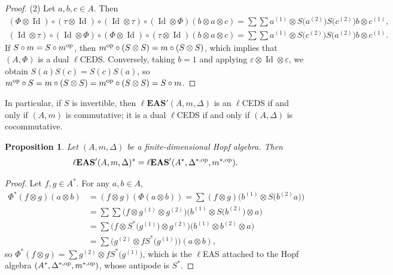 \documentclass[10pt,a4paper]{amsart}
\numberwithin{equation}{section}
\newtheorem{Proposition}[Theorem]{Proposition}
 { \theoremstyle{definition}
\newtheorem{Definition}[Theorem]{Definition}
\newtheorem{Note}[Theorem]{Note}
\newtheorem{Example}[Theorem]{Example}
\newtheorem{Remark}[Theorem]{Remark}
\newtheorem{Notation}[Theorem]{Notation}}
\newcommand{\leas}{\ell\mathbf{EAS}}
\begin{document}
\begin{proof}
(2) Let $a,b,c\in A$. Then
\begin{gather*}
(\Phi\otimes \operatorname{Id})\circ (\tau \otimes \operatorname{Id})\circ (\operatorname{Id} \otimes \tau)\circ (\operatorname{Id} \otimes \Phi)(b\otimes a\otimes c)=\sum \sum a^{(1)}\otimes S\bigl(a^{(2)}\bigr)S\bigl(c^{(2)}\bigr)b\otimes c^{(1)},\\
\nonumber(\operatorname{Id} \otimes \tau)\circ (\operatorname{Id} \otimes \Phi)\circ (\Phi\otimes \operatorname{Id})\circ (\tau \otimes \operatorname{Id})(b\otimes a\otimes c)=\sum \sum a^{(1)}\otimes S\bigl(c^{(2)}\bigr)S\bigl(a^{(2)}\bigr)b\otimes c^{(1)}.
\end{gather*}
If $S\circ m=S\circ m^{\rm op}$, then $m^{\rm op}\circ (S\otimes S)=m\circ (S\otimes S)$, which implies that $(A,\Phi)$ is a dual $\ell$CEDS. Conversely, taking $b=1$ and applying $\varepsilon \otimes \operatorname{Id} \otimes \varepsilon$, we obtain
$S(a)S(c)=S(c)S(a)$,
so~${m^{\rm op}\circ S=m\circ (S\otimes S)=m^{\rm op}\circ (S\otimes S)=S\circ m}$. \end{proof}

\begin{Remark}
In particular, if $S$ is invertible, then $\leas'(A,m,\Delta)$ is an $\ell$CEDS if and only if $(A,m)$ is commutative; it is a dual $\ell$CEDS if and only if $(A,\Delta)$ is cocommutative.
\end{Remark}

\begin{Proposition}
Let $(A,m,\Delta)$ be a finite-dimensional Hopf algebra. Then \[
\leas'(A,m,\Delta)^* =\leas'(A^*,\Delta^{*,{\rm op}},m^{*,{\rm op}}).\]
\end{Proposition}

\begin{proof}
Let $f,g\in A^*$. For any $a,b\in A$,
\begin{align*}
\Phi^*(f\otimes g)(a\otimes b)&=(f\otimes g)(\Phi(a\otimes b))=\sum (f\otimes g)\bigl(b^{(1)}\otimes S\bigl(b^{(2)}a\bigr)\bigr)\\
&=\sum \sum \bigl(f\otimes g^{(1)}\otimes g^{(2)}\bigr)\bigl(b^{(1)}\otimes S\bigl(b^{(2)}\bigr)\otimes a\bigr)\\
&=\sum \bigl(f\otimes S^*\bigl(g^{(1)}\bigr)\otimes g^{(2)}\bigr)\bigl(b^{(1)}\otimes b^{(2)}\otimes a\bigr)\\
&=\sum \bigl(g^{(2)}\otimes fS^*\bigl(g^{(1)}\bigr)\bigr)(a\otimes b),
\end{align*}
so $\Phi^*(f\otimes g)=\sum g^{(2)}\otimes fS^*\bigl(g^{(1)}\bigr)$, which is the $\ell$EAS attached to the Hopf algebra $(A^*,\Delta^{*,{\rm op}},\allowbreak m^{*,{\rm op}})$, whose antipode is $S^*$. \end{proof}
\end{document}
